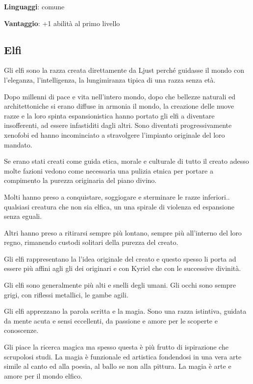 \documentclass[a4paper,11pt,twoside,openany]{book}
\begin{document}
\textbf{Linguaggi}: comune

\textbf{Vantaggio}: +1 abilità al primo livello

\subsection{Elfi}

\label{elfi}

Gli elfi sono la razza creata direttamente da Ljust perché guidasse il mondo con l'eleganza, l'intelligenza, la lungimiranza tipica di una razza senza età.

Dopo millenni di pace e vita nell'intero mondo, dopo che bellezze naturali ed architettoniche si erano diffuse in armonia il mondo, la creazione delle nuove razze e la loro spinta espansionistica hanno portato gli elfi a diventare insofferenti, ad essere infastiditi dagli altri.
Sono diventati progressivamente xenofobi ed hanno incominciato a stravolgere l'impianto originale del loro mandato.

Se erano stati creati come guida etica, morale e culturale di tutto il creato adesso molte fazioni vedono come necessaria una pulizia etnica per portare a compimento la purezza originaria del piano divino. 

Molti hanno preso a conquistare, soggiogare e sterminare le razze inferiori.. qualsiasi creatura che non sia elfica, un una spirale di violenza ed espansione senza eguali.

Altri hanno preso a ritirarsi sempre più lontano, sempre più all'interno del loro regno, rimanendo custodi solitari della purezza del creato. 

Gli elfi rappresentano la l'idea originale del creato e questo spesso li porta ad essere più affini agli gli dei originari e con Kyriel che con le successive divinità.

Gli elfi sono generalmente più alti e snelli degli umani. Gli occhi sono sempre grigi, con riflessi metallici, le gambe agili.

Gli elfi apprezzano la parola scritta e la magia. Sono una razza istintiva, guidata da mente acuta e sensi eccellenti, da passione e amore per le scoperte e conoscenze.

Gli piace la ricerca magica ma spesso questa è più frutto di ispirazione che scrupolosi studi. La magia è funzionale ed artistica fondendosi in una vera arte simile al canto ed alla poesia, al ballo se non alla pittura.
La magia è arte e amore per il mondo elfico.
\end{document}
